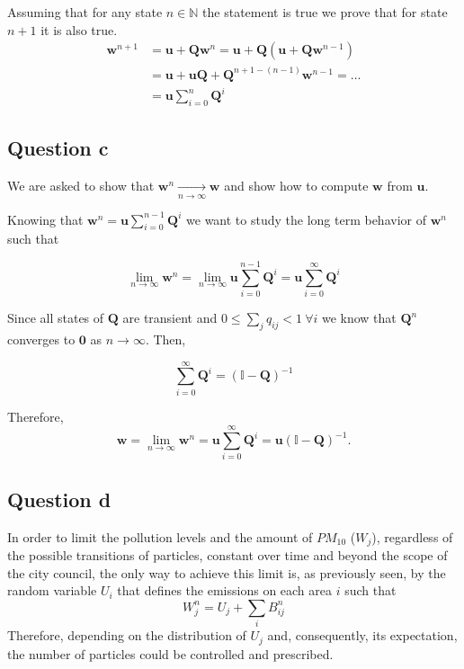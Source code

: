 \documentclass[11pt, a4paper]{article}
\begin{document}
Assuming that for any state $n\in\mathbb N$ the statement is true we prove that for state $n+1$ it is also true.
\[
\begin{aligned}
\mathbf w^{n+1} &= \mathbf u + \mathbf Q\mathbf w^{n} = \mathbf u + \mathbf Q(\mathbf u + \mathbf Q\mathbf w^{n-1}) \\ 
& =\mathbf u + \mathbf u \mathbf Q + \mathbf Q^{n+1 - (n-1)}\mathbf w^{n-1} = \ldots \\ 
& = \mathbf u \sum_{i=0}^{n} \mathbf Q^i
\end{aligned}
\]

\subsection{Question c}
We are asked to show that $\mathbf w^n \xrightarrow[n\rightarrow \infty]{} \mathbf w$ and show how to compute $\mathbf w$ from $\mathbf u$.

Knowing that $\mathbf w^n = \mathbf u \sum_{i=0}^{n-1} \mathbf Q^i$  we want to study the long term behavior of $\mathbf w^n$ such that

\[
\lim_{n \rightarrow \infty} \mathbf w^n = \lim_{n \rightarrow \infty} \mathbf u \sum_{i=0}^{n-1}\mathbf Q^i = \mathbf u \sum_{i=0}^{\infty}\mathbf Q^i
\]

Since all states of $\mathbf Q$ are transient and $0 \leq \sum_j q_{ij} < 1 \ \forall i $ we know that $\mathbf Q^n$ converges to $\mathbf 0$ as $n \rightarrow \infty$. Then,

\[
\sum^\infty_{i=0}\mathbf Q^i = (\mathbb I - \mathbf Q)^{-1}
\]

Therefore, 
\[
\mathbf w = \lim_{n \rightarrow \infty} \mathbf w^n = \mathbf u \sum_{i=0}^{\infty}\mathbf Q^i = \mathbf u (\mathbb I - \mathbf Q)^{-1}.
\]

\subsection{Question d}

In order to limit the pollution levels and the amount of $PM_{10}$ ($W_j$), regardless of the possible transitions of particles, constant over time and beyond the scope of the city council, the only way to achieve this limit is, as previously seen, by the random variable $U_i$ that defines the emissions on each area $i$ such that
\[
W_j^n = U_j + \sum_iB_{ij}^n
\]
Therefore, depending on the distribution of $U_j$ and, consequently, its expectation, the number of particles could be controlled and prescribed.
\end{document}

